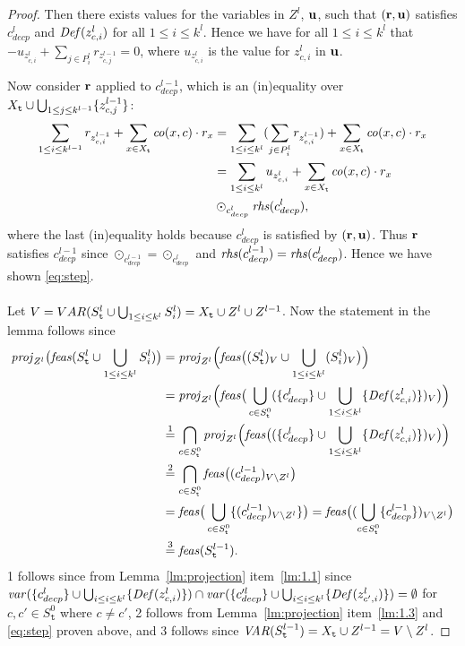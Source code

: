 \begin{proof}
Then there exists values for the variables in $Z^l$, $\mathbf{u}$, such that $(\mathbf{r},\mathbf{u})$ satisfies $c^l_{decp}$ and $\mathit{Def}(z^l_{c,i})$ for all $1\leq i\leq k^l$. Hence we have for all $1\leq i \leq k^l$ that $-u_{z^l_{c,i}}+\sum_{j\in P^l_i}r_{z^{l-1}_{c,j}} = 0$, where $u_{z^l_{c,i}}$ is the value for $z^l_{c,i}$ in $\mathbf{u}$. 

Now consider $\mathbf{r}$ applied to $c^{l-1}_{decp}$, which is an (in)equality over $X_{\texttt{t}}\cup\bigcup_{1\leq j\leq k^{l-1}}\{z^{l-1}_{c,j}\}$:
\begin{align*}
\sum_{1\leq i \leq k^{l-1}}r_{z^{l-1}_{c,i}} + \sum_{x\in X_{\texttt{t}}}\mathit{co}(x,c)\cdot r_x
&= \sum_{1\leq i \leq k^l}(\sum_{j\in P^l_i}r_{z^{l-1}_{c,i}}) + \sum_{x\in X_{\texttt{t}}}\mathit{co}(x,c)\cdot r_x\\
&= \sum_{1\leq i \leq k^{l}}u_{z^{l}_{c,i}} + \sum_{x\in X_{\texttt{t}}}\mathit{co}(x,c)\cdot r_x\\
&\odot_{c^l_{decp}} \mathit{rhs}(c^l_{decp}),
\end{align*}
where the last (in)equality holds because $c^l_{decp}$ is satisfied by $(\mathbf{r},\mathbf{u})$. 
Thus $\mathbf{r}$ satisfies $c^{l-1}_{decp}$ since $\odot_{c^{l-1}_{decp}}=\odot_{c^l_{decp}}$ and $\mathit{rhs}(c^{l-1}_{decp})=\mathit{rhs}(c^l_{decp})$. Hence we have shown \eqref{eq:step}.
\\\\
Let $V = VAR(S^l_{\texttt{t}}\cup\bigcup_{1\leq i\leq k^l} S^l_i) = X_{\texttt{t}}\cup Z^l \cup Z^{l-1}$. Now the statement in the lemma follows since
\begin{align*}
\mathit{proj}_{Z^l}\big(\mathit{feas}(S^l_{\texttt{t}} \cup\bigcup_{1\leq i\leq k^l}S^l_i)\big)
&=\mathit{proj}_{Z^l}\Big(\mathit{feas}\big((S^l_{\texttt{t}})_V \cup\bigcup_{1\leq i\leq k^l}(S^l_i)_V\big)\Big)\\
&=\mathit{proj}_{Z^l}\Big(\mathit{feas}\big(\bigcup_{c\in S^0_{\texttt{t}}}(\{c_{decp}^{l}\}\cup\bigcup_{1\leq i\leq k^l}\{\mathit{Def}(z^l_{c,i})\})_V\big)\Big)\\
&\overset{1}= \bigcap_{c\in S^0_{\texttt{t}}}\mathit{proj}_{Z^l}\Big(\mathit{feas}\big((\{c_{decp}^{l}\}\cup\bigcup_{1\leq i\leq k^l}\{\mathit{Def}(z^l_{c,i})\})_V\big)\Big)\\
&\overset{2}= \bigcap_{c\in S^0_{\texttt{t}}}\mathit{feas}\big((c_{decp}^{l-1})_{V\setminus Z^l}\big)\\
&= \mathit{feas}\big(\bigcup_{c\in S^0_{\texttt{t}}}\{(c_{decp}^{l-1})_{V\setminus Z^l}\}\big)
= \mathit{feas}\big((\bigcup_{c\in S^0_{\texttt{t}}}\{c_{decp}^{l-1}\})_{V\setminus Z^l}\big)\\
&\overset{3}= \mathit{feas}(S^{l-1}_{\texttt{t}}).
\end{align*}
1 follows since from Lemma~\ref{lm:projection} item~\ref{lm:1.1} since $\mathit{var}(\{c^l_{decp}\}\cup\bigcup_{i\leq i\leq k^l}\{\mathit{Def}(z^l_{c,i})\})\cap\mathit{var}(\{c'^l_{decp}\}\cup\bigcup_{i\leq i\leq k^l}\{\mathit{Def}(z^l_{c',i})\})=\emptyset$ for $c,c'\in S^0_\texttt{t}$ where $c\neq c'$, 2 follows from Lemma~\ref{lm:projection} item~\ref{lm:1.3} and \eqref{eq:step} proven above, and 3 follows since $\mathit{VAR}(S^{l-1}_{\texttt{t}}) = X_{\texttt{t}}\cup Z^{l-1} = V\setminus Z^l$. 
\end{proof}

